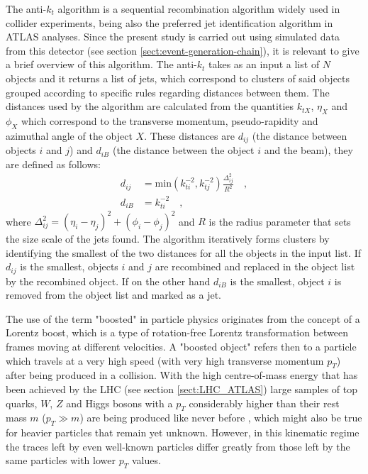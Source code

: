 \documentclass[main]{subfiles} %
\begin{document}
The anti-$k_t$ algorithm \cite{Cacciari2008} is a sequential recombination algorithm widely used in collider experiments, being also the preferred jet identification algorithm in ATLAS analyses. Since the present study is carried out using simulated data from this detector (see section \ref{sect:event-generation-chain}), it is relevant to give a brief overview of this algorithm. The anti-$k_t$ takes as an input a list of $N$ objects and it returns a list of jets, which correspond to clusters of said objects grouped according to specific rules regarding distances between them. The distances used by the algorithm are calculated from the quantities $k_{tX}$, $\eta_X$ and $\phi_X$ which correspond to the transverse momentum, pseudo-rapidity and azimuthal angle of the object $X$. These distances are $d_{ij}$ (the distance between objects $i$ and $j$) and $d_{iB}$ (the distance between the object $i$ and the beam), they are defined as follows:
\begin{align}
  d_{ij} &= \text{min}(k_{ti}^{-2},k_{tj}^{-2})\frac{\Delta_{ij}^2}{R^2} \quad ,\\
  d_{iB} &= k_{ti}^{-2} \quad ,
\end{align}
where $\Delta_{ij}^2 = (\eta_i - \eta_j)^2 + (\phi_i - \phi_j)^2$ and $R$ is the radius parameter that sets the size scale of the jets found. The algorithm iteratively forms clusters by identifying the smallest of the two distances for all the objects in the input list. If $d_{ij}$ is the smallest, objects $i$ and $j$ are recombined and replaced in the object list by the recombined object. If on the other hand $d_{iB}$ is the smallest, object $i$ is removed from the object list and marked as a jet.\\

\label{sect:boosted-particles}
\vspace{20pt}

The use of the term "boosted" in particle physics originates from the concept of a Lorentz boost, which is a type of rotation-free Lorentz transformation between frames moving at different velocities. A "boosted object" refers then to a particle which travels at a very high speed (with very high transverse momentum $p_T$) after being produced in a collision. With the high centre-of-mass energy that has been achieved by the LHC (see section \ref{sect:LHC_ATLAS}) large samples of top quarks, $W$, $Z$ and Higgs bosons with a $p_T$ considerably higher than their rest mass $m$ ($p_T \gg m$) are being produced like never before \cite{Altheimer2014}, which might also be true for heavier particles that remain yet unknown. However, in this kinematic regime the traces left by even well-known particles differ greatly from those left by the same particles with lower $p_T$ values.\\
\end{document}
